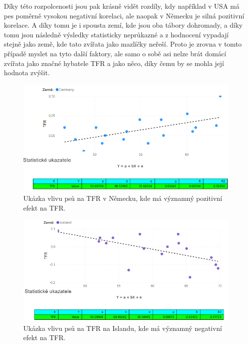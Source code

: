 \documentclass[thesis=M,czech]{FITthesis}[2022/10/08]
\begin{document}
Díky této rozpolcenosti jsou pak krásně vidět rozdíly, kdy  například v USA má pes poměrně vysokou negativní korelaci, ale naopak v Německu je silná pozitivní korelace. A díky tomu je i spousta zemí, kde jsou oba tábory dohromady, a díky tomu jsou následně výsledky statisticky neprůkazné a z hodnocení vypadají stejně jako země, kde tato zvířata jako mazlíčky neřeší. Proto je zrovna v tomto případě myslet na tyto další faktory, ale samo o sobě asi nelze brát domácí zvířata jako značné hybatele TFR a jako něco, díky čemu by se mohla její hodnota zvýšit.

\begin{figure}
    \centering
    \includegraphics[width=\textwidth]{DP-obrazky/Dog_germany.png}
    \caption{Ukázka vlivu psů na TFR v Německu, kde má významný pozitivní efekt na TFR.}
    \label{fig:Dog_Germany}
\end{figure}
\begin{figure}
    \centering
    \includegraphics[width=\textwidth]{DP-obrazky/Dog_island.png}
    \caption{Ukázka vlivu psů na TFR na Islandu, kde má významný negativní efekt na TFR.}
    \label{fig:Dog_Island}
\end{figure}
\end{document}

